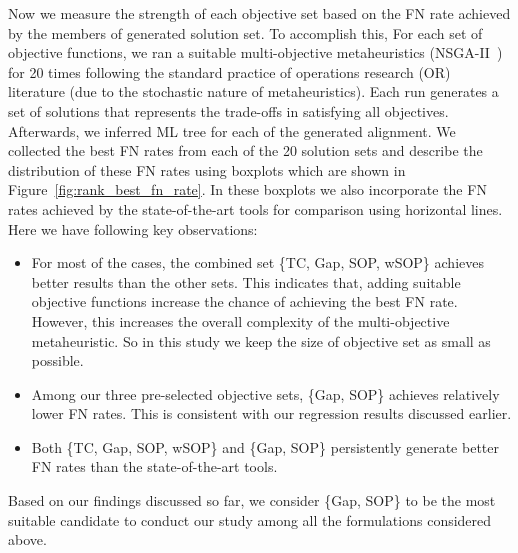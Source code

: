 Now we measure the strength of each objective set based on the FN rate achieved by the members of generated solution set. To accomplish this, For each set of objective functions, we ran a suitable multi-objective metaheuristics (NSGA-II~\citep{deb2002fast}) for 20 times following the standard practice of operations research (OR) literature (due to the stochastic nature of metaheuristics). Each run generates a set of solutions that represents the trade-offs in satisfying all objectives. Afterwards, we inferred ML tree for each of the generated alignment. We collected the best FN rates from each of the 20 solution sets and describe the distribution of these FN rates using boxplots which are shown in Figure~\ref{fig:rank_best_fn_rate}. In these boxplots we also incorporate the FN rates achieved by the state-of-the-art tools for comparison using horizontal lines. Here we have following key observations:
\begin{itemize}
	\item For most of the cases, the combined set \{TC, Gap, SOP, wSOP\} achieves better results than the other sets. This indicates that, adding suitable objective functions increase the chance of achieving the best FN rate. However, this increases the overall complexity of the multi-objective metaheuristic. So in this study we keep the size of objective set as small as possible.
	\item Among our three pre-selected objective sets, \{Gap, SOP\} achieves relatively lower FN rates. This is consistent with our regression results discussed earlier.
	\item Both \{TC, Gap, SOP, wSOP\} and \{Gap, SOP\} persistently generate better FN rates than the state-of-the-art tools.
\end{itemize}
Based on our findings discussed so far, we consider \{Gap, SOP\} to be the most suitable candidate to conduct our study among all the formulations considered above. %
